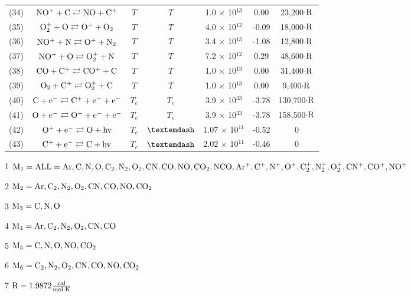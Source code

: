 \documentclass{warpdoc}
\begin{document}
\begin{table}[!h]
\begin{center}
\begin{threeparttable}
\begin{tabular}{ccccccc}
(34) & $\rm NO^+ + C \rightleftarrows NO + C^+ $ & $T$ & $T$ & 1.0 $\times$ 10$^{13}$  & 0.00 & 23,200$\cdot \rm R$ \\
(35) & $\rm O^+_2 + O \rightleftarrows O^+ + O_2 $ & $T$ & $T$ & 4.0 $\times$ 10$^{12}$  & -0.09 & 18,000$\cdot \rm R$ \\
(36) & $\rm NO^+ + N \rightleftarrows O^+ + N_2 $ & $T$ & $T$ & 3.4 $\times$ 10$^{13}$  & -1.08 & 12,800$\cdot \rm R$ \\
(37) & $\rm NO^+ + O \rightleftarrows O^+_2 + N $ & $T$ & $T$ & 7.2 $\times$ 10$^{12}$  & 0.29 & 48,600$\cdot \rm R$ \\
(38) & $\rm CO + C^+ \rightleftarrows CO^+ + C $ & $T$ & $T$ & 1.0 $\times$ 10$^{13}$  & 0.00 & 31,400$\cdot \rm R$ \\
(39) & $\rm O_2 + C^+ \rightleftarrows O^+_2+ C $ & $T$ & $T$ & 1.0 $\times$ 10$^{13}$  & 0.00 & 9,400$\cdot \rm R$ \\



(40) & $\rm C + e^- \rightleftarrows C^+ + e^- + e^- $ & $T_e$ & $T_e$ & 3.9 $\times$ 10$^{33}$  & -3.78 & 130,700$\cdot \rm R$ \\
(41) & $\rm O + e^- \rightleftarrows O^+ + e^- + e^- $ & $T_e$ & $T_e$ & 3.9 $\times$ 10$^{33}$  & -3.78 & 158,500$\cdot \rm R$ \\



(42) & $\rm O^+ + e^- \rightleftarrows O + hv $ & $T_e$ & $\textemdash$ & 1.07 $\times$ 10$^{11}$  & -0.52 & 0 \\
(43) & $\rm C^+ + e^- \rightleftarrows C + hv $ & $T_e$ & $\textemdash$ & 2.02 $\times$ 10$^{11}$  & -0.46 & 0 \\


\bottomrule
\end{tabular}
\label{tab:park}
\begin{tablenotes}
\item[{1}] $\rm M_1 = ALL = Ar, C, N, O, C_2, N_2, O_2, CN, CO, NO, CO_2, NCO, Ar^+, C^+, N^+, O^+, C^+_2, N^+_2, O^+_2, CN^+, CO^+, NO^+$
\item[{2}] $\rm M_2 = Ar, C_2, N_2, O_2, CN, CO, NO, CO_2$
\item[{3}] $\rm M_3 = C, N, O$
\item[{4}] $\rm M_4 = Ar, C_2, N_2, O_2, CN, CO$
\item[{5}] $\rm M_5 = C, N, O, NO, CO_2$
\item[{6}] $\rm M_6 = C_2, N_2, O_2, CN, CO, NO, CO_2$
\item[{7}] $\rm R = 1.9872 \frac{\rm cal}{\rm mol \cdot K}$

\end{tablenotes}
\end{threeparttable}
\end{center}
\end{table} 
%



\end{document}
